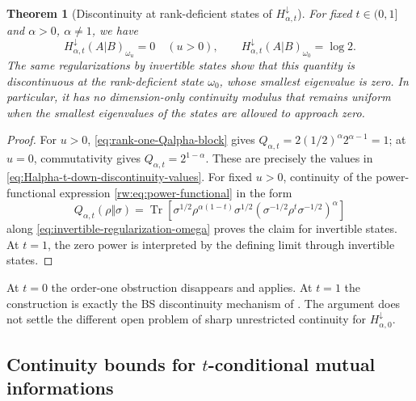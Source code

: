 \documentclass[11pt]{article}
\newtheorem{theorem}[theorem]{Theorem}
\theoremstyle{remark}
\newcommand{\1}{\mathbbm{1}}
\begin{document}
\begin{theorem}[Discontinuity at rank-deficient states of
$H_{\alpha,t}^\downarrow$]
\label{theo:Halpha-t-down-discontinuous}
For fixed $t\in(0,1]$ and $\alpha>0$, $\alpha\neq1$, we have
\begin{equation}
 H_{\alpha,t}^\downarrow(A|B)_{\omega_u}=0\quad(u>0),
 \qquad
 H_{\alpha,t}^\downarrow(A|B)_{\omega_0}=\log2.
 \label{eq:Halpha-t-down-discontinuity-values}
\end{equation}
The same regularizations by invertible states show that this quantity is
discontinuous at the rank-deficient state $\omega_0$, whose smallest
eigenvalue is zero.  In particular, it has no dimension-only
continuity modulus that remains uniform when the smallest eigenvalues
of the states are allowed to approach zero.
\end{theorem}

\begin{proof}
For $u>0$, \eqref{eq:rank-one-Qalpha-block} gives
$Q_{\alpha,t}=2(1/2)^\alpha2^{\alpha-1}=1$; at $u=0$,
commutativity gives $Q_{\alpha,t}=2^{1-\alpha}$.  These are precisely
the values in \eqref{eq:Halpha-t-down-discontinuity-values}.  For
fixed $u>0$, continuity of the power-functional expression
\eqref{rw:eq:power-functional} in the form
\begin{equation}
 Q_{\alpha,t}(\rho\Vert\sigma)
 =\operatorname{Tr}\!\left[
 \sigma^{1/2}\rho^{\alpha(1-t)}\sigma^{1/2}
 (\sigma^{-1/2}\rho^t\sigma^{-1/2})^\alpha
 \right]
 \label{eq:boundary-Q-nonnegative-powers}
\end{equation}
along \eqref{eq:invertible-regularization-omega} proves the claim for
invertible states.  At $t=1$, the zero power is interpreted by the
defining limit through invertible states.
\end{proof}

At $t=0$ the order-one obstruction disappears and
 applies.  At $t=1$
the construction is exactly the BS discontinuity mechanism of
\cite[Proposition~6.7]{bluhm2023continuity}.  The argument does not
settle the different open problem of sharp unrestricted continuity
for $H_{\alpha,0}^\downarrow$.

\subsection{Continuity bounds for
\texorpdfstring{$t$}{t}-conditional mutual informations}
\label{subsec:t-CMI-continuity-boundary}
\end{document}

